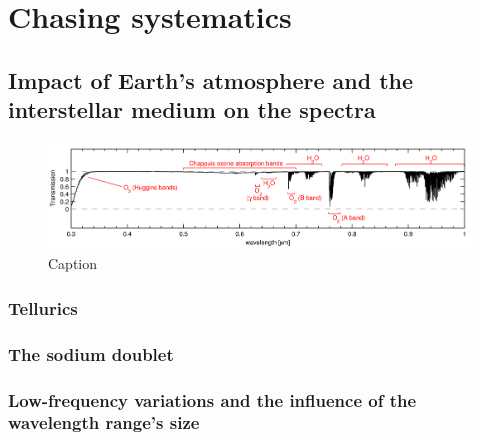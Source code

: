 \chapter{Chasing systematics}
\label{resultsa}
    \section{Impact of Earth's atmosphere and the interstellar medium on the spectra}
    \begin{figure}[H]
        \centering
        \includegraphics[width=\textwidth]{report/images/chap4_results/paranal_smette.png}
        \caption{Caption}
        \label{4.1a}
    \end{figure}
        \subsection{Tellurics}
        \subsection{The sodium doublet}
        \subsection{Low-frequency variations and the influence of the wavelength range's size}
